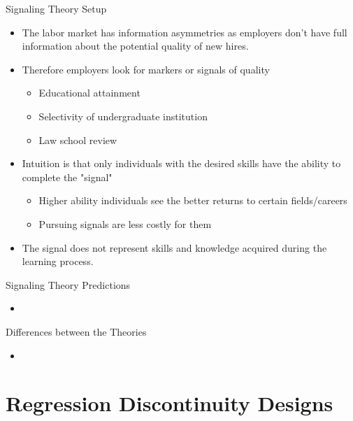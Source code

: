 \documentclass{beamer}
\begin{document}
\begin{frame}[<+->]{Signaling Theory Setup}
     \begin{itemize}
        \item The labor market has information asymmetries as employers don't have full information about the potential quality of new hires.
        \item Therefore employers look for markers or signals of quality
        \begin{itemize}
            \item Educational attainment
            \item Selectivity of undergraduate institution 
            \item Law school review
        \end{itemize}
        \item Intuition is that only individuals with the desired skills have the ability to complete the "signal" 
        \begin{itemize}
            \item Higher ability individuals see the better returns to certain fields/careers
            \item Pursuing signals are less costly for them
        \end{itemize}
        \item The signal does not represent skills and knowledge acquired during the learning process.
    \end{itemize}   
\end{frame}

\begin{frame}{Signaling Theory Predictions}
    \begin{itemize}
        \item 
    \end{itemize}
\end{frame}

\begin{frame}{Differences between the Theories}
    \begin{itemize}
        \item 
    \end{itemize}
\end{frame}

\section{Regression Discontinuity Designs}
\frame{\sectionpage}
\end{document}

